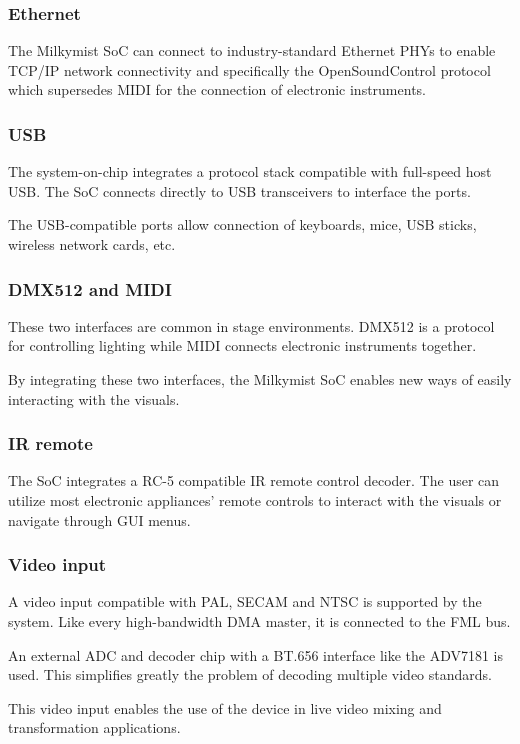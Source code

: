 \documentclass[a4paper,11pt,twocolumn]{paper}
\begin{document}
\subsubsection{Ethernet}
The Milkymist SoC can connect to industry-standard Ethernet PHYs to enable TCP/IP network connectivity and specifically the OpenSoundControl protocol which supersedes MIDI for the connection of electronic instruments.

\subsubsection{USB}
The system-on-chip integrates a protocol stack compatible with full-speed host USB. The SoC connects directly to USB transceivers to interface the ports.

The USB-compatible ports allow connection of keyboards, mice, USB sticks, wireless network cards, etc.

\subsubsection{DMX512 and MIDI}
These two interfaces are common in stage environments. DMX512 is a protocol for controlling lighting while MIDI connects electronic instruments together.

By integrating these two interfaces, the Milkymist SoC enables new ways of easily interacting with the visuals.

\subsubsection{IR remote}
The SoC integrates a RC-5 compatible IR remote control decoder. The user can utilize most electronic appliances' remote controls to interact with the visuals or navigate through GUI menus.

\subsubsection{Video input}
A video input compatible with PAL, SECAM and NTSC is supported by the system. Like every high-bandwidth DMA master, it is connected to the FML bus.

An external ADC and decoder chip with a BT.656 interface like the ADV7181 is used. This simplifies greatly the problem of decoding multiple video standards.

This video input enables the use of the device in live video mixing and transformation applications.
\end{document}
